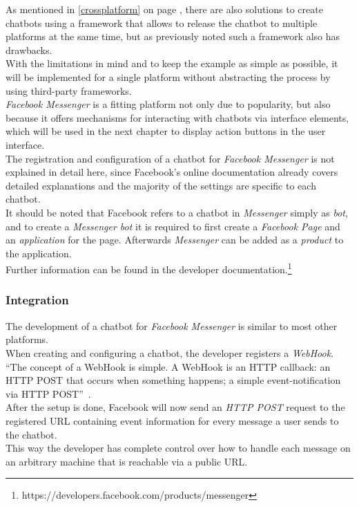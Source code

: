 As mentioned in \ref{crossplatform} on page \pageref{crossplatform},
there are also solutions to create chatbots using a framework that allows to release the chatbot to multiple platforms at the same time,
but as previously noted such a framework also has drawbacks.
\\
With the limitations in mind and to keep the example as simple as possible,
it will be implemented for a single platform without abstracting the process by using third-party frameworks.
\\

\emph{Facebook Messenger} is a fitting platform not only due to popularity,
but also because it offers mechanisms for interacting with chatbots via interface elements,
which will be used in the next chapter to display action buttons in the user interface.
\\

The registration and configuration of a chatbot for \emph{Facebook Messenger} is not explained in detail here,
since Facebook's online documentation already covers detailed explanations
and the majority of the settings are specific to each chatbot.
\\
It should be noted that Facebook refers to a chatbot in \emph{Messenger} simply as \emph{bot},
and to create a \emph{Messenger bot} it is required to first create a \emph{Facebook Page} and an \emph{application} for the page.
Afterwards \emph{Messenger} can be added as a \emph{product} to the application.
\\
Further information can be found in the developer documentation.\footnote{https://developers.facebook.com/products/messenger}

\subsubsection{Integration}

The development of a chatbot for \emph{Facebook Messenger} is similar to most other platforms.
\\
When creating and configuring a chatbot, the developer registers a \emph{WebHook}.
``The concept of a WebHook is simple. A WebHook is an HTTP callback: an HTTP POST that occurs when something happens; a simple event-notification via HTTP POST''~\cite{webhook}.
\\
After the setup is done,
Facebook will now send an \emph{HTTP POST} request to the registered URL containing event information for every message a user sends to the chatbot.
\\
This way the developer has complete control over how to handle each message on an arbitrary machine that is reachable via a public URL.


